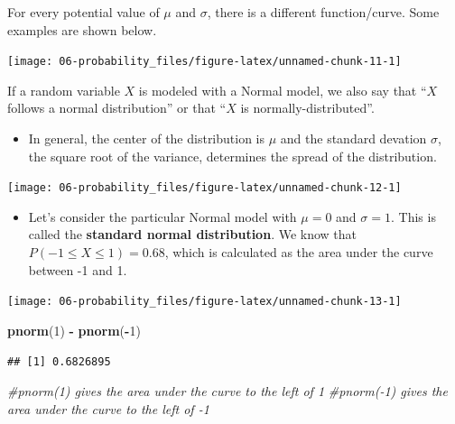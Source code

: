 \documentclass[
]{book}
\newenvironment{Shaded}{\begin{snugshade}}{\end{snugshade}}
\newcommand{\CommentTok}[1]{\textcolor[rgb]{0.56,0.35,0.01}{\textit{#1}}}
\newcommand{\DecValTok}[1]{\textcolor[rgb]{0.00,0.00,0.81}{#1}}
\newcommand{\FunctionTok}[1]{\textcolor[rgb]{0.13,0.29,0.53}{\textbf{#1}}}
\newcommand{\NormalTok}[1]{#1}
\newcommand{\SpecialCharTok}[1]{\textcolor[rgb]{0.81,0.36,0.00}{\textbf{#1}}}
\providecommand{\tightlist}{%
  \setlength{\itemsep}{0pt}\setlength{\parskip}{0pt}}
\begin{document}
For every potential value of \(\mu\) and \(\sigma\), there is a different function/curve. Some examples are shown below.

\begin{center}\texttt{[image: 06-probability\_files/figure-latex/unnamed-chunk-11-1]} \end{center}

If a random variable \(X\) is modeled with a Normal model, we also say that ``\(X\) follows a normal distribution'' or that ``\(X\) is normally-distributed''.

\begin{itemize}
\tightlist
\item
  In general, the center of the distribution is \(\mu\) and the standard devation \(\sigma\), the square root of the variance, determines the spread of the distribution.
\end{itemize}

\begin{center}\texttt{[image: 06-probability\_files/figure-latex/unnamed-chunk-12-1]} \end{center}

\begin{itemize}
\tightlist
\item
  Let's consider the particular Normal model with \(\mu=0\) and \(\sigma=1\). This is called the \textbf{standard normal distribution}. We know that \(P(-1\leq X \leq 1) = 0.68\), which is calculated as the area under the curve between -1 and 1.
\end{itemize}

\begin{center}\texttt{[image: 06-probability\_files/figure-latex/unnamed-chunk-13-1]} \end{center}

\begin{Shaded}
\begin{Highlighting}[]
\FunctionTok{pnorm}\NormalTok{(}\DecValTok{1}\NormalTok{) }\SpecialCharTok{{-}} \FunctionTok{pnorm}\NormalTok{(}\SpecialCharTok{{-}}\DecValTok{1}\NormalTok{) }
\end{Highlighting}
\end{Shaded}

\begin{verbatim}
## [1] 0.6826895
\end{verbatim}

\begin{Shaded}
\begin{Highlighting}[]
\CommentTok{\#pnorm(1) gives the area under the curve to the left of 1}
\CommentTok{\#pnorm({-}1) gives the area under the curve to the left of {-}1}
\end{Highlighting}
\end{Shaded}
\end{document}
